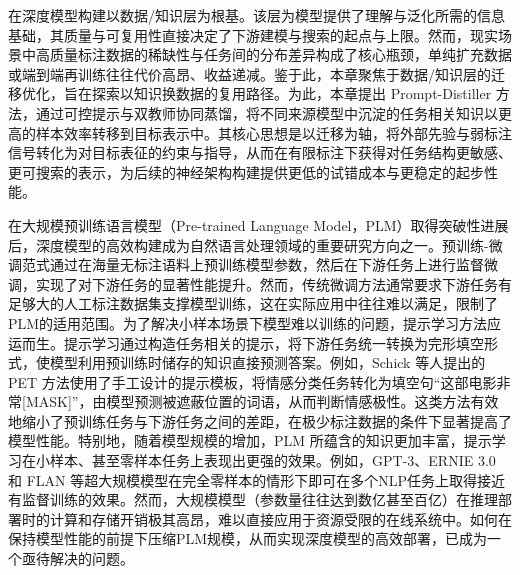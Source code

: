 \documentclass[../main.tex]{subfiles}
\begin{document}
\label{sec:ch3-dual-contrastive-distillation-for-few-shot-prompts}

\label{sec:ch3-1-introduction}

在深度模型构建以数据/知识层为根基。该层为模型提供了理解与泛化所需的信息基础，其质量与可复用性直接决定了下游建模与搜索的起点与上限。然而，现实场景中高质量标注数据的稀缺性与任务间的分布差异构成了核心瓶颈，单纯扩充数据或端到端再训练往往代价高昂、收益递减。鉴于此，本章聚焦于数据/知识层的迁移优化，旨在探索以知识换数据的复用路径。为此，本章提出 Prompt-Distiller 方法，通过可控提示与双教师协同蒸馏，将不同来源模型中沉淀的任务相关知识以更高的样本效率转移到目标表示中。其核心思想是以迁移为轴，将外部先验与弱标注信号转化为对目标表征的约束与指导，从而在有限标注下获得对任务结构更敏感、更可搜索的表示，为后续的神经架构构建提供更低的试错成本与更稳定的起步性能。

在大规模预训练语言模型（Pre-trained Language Model，PLM）取得突破性进展后，深度模型的高效构建成为自然语言处理领域的重要研究方向之一。预训练-微调范式\cite{bertpretraining_devlin_2019}通过在海量无标注语料上预训练模型参数，然后在下游任务上进行监督微调，实现了对下游任务的显著性能提升。然而，传统微调方法通常要求下游任务有足够大的人工标注数据集支撑模型训练，这在实际应用中往往难以满足，限制了PLM的适用范围。为了解决小样本场景下模型难以训练的问题，提示学习方法应运而生。提示学习通过构造任务相关的提示，将下游任务统一转换为完形填空形式，使模型利用预训练时储存的知识直接预测答案。例如，Schick 等人提出的 PET 方法\cite{exploitingclozequestions_schick_2021}使用了手工设计的提示模板，将情感分类任务转化为填空句“这部电影非常[MASK]”，由模型预测被遮蔽位置的词语，从而判断情感极性。这类方法有效地缩小了预训练任务与下游任务之间的差距，在极少标注数据的条件下显著提高了模型性能。特别地，随着模型规模的增加，PLM 所蕴含的知识更加丰富，提示学习在小样本、甚至零样本任务上表现出更强的效果。例如，GPT-3、ERNIE 3.0 和 FLAN 等超大规模模型在完全零样本的情形下即可在多个NLP任务上取得接近有监督训练的效果\cite{languagemodelsare_brown_2020,ernie3.0large_sun_2021,finetunedlanguagemodels_wei_2022}。然而，大规模模型（参数量往往达到数亿甚至百亿）在推理部署时的计算和存储开销极其高昂，难以直接应用于资源受限的在线系统中。如何在保持模型性能的前提下压缩PLM规模，从而实现深度模型的高效部署，已成为一个亟待解决的问题。
\end{document}
